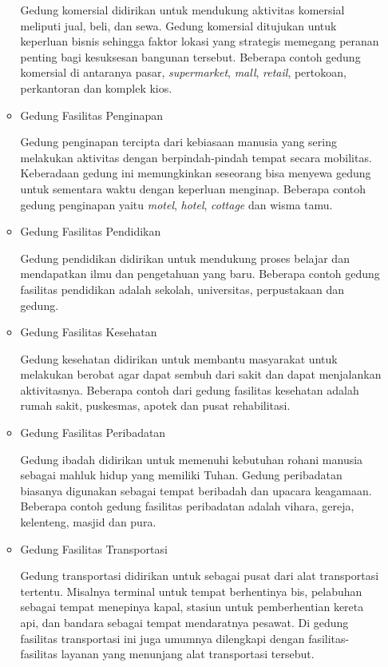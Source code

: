 \begin{itemize}
\begin{itemize}
		Gedung komersial didirikan untuk mendukung aktivitas komersial meliputi jual, beli, dan sewa. Gedung komersial ditujukan untuk keperluan bisnis sehingga faktor lokasi yang strategis memegang peranan penting bagi kesuksesan bangunan tersebut. Beberapa contoh gedung komersial di antaranya pasar, \textit{supermarket}, \textit{mall}, \textit{retail}, pertokoan, perkantoran dan komplek kios.
		
		\item Gedung Fasilitas Penginapan
		
		Gedung penginapan tercipta dari kebiasaan manusia yang sering melakukan aktivitas dengan berpindah-pindah tempat secara mobilitas. Keberadaan gedung ini memungkinkan seseorang bisa menyewa gedung untuk sementara waktu dengan keperluan menginap. Beberapa contoh gedung penginapan yaitu \textit{motel}, \textit{hotel}, \textit{cottage} dan wisma tamu.
	
		\item Gedung Fasilitas Pendidikan
		
		Gedung pendidikan didirikan untuk mendukung proses belajar dan mendapatkan ilmu dan pengetahuan yang baru. Beberapa contoh gedung fasilitas pendidikan adalah sekolah, universitas, perpustakaan dan gedung.
		
		\item Gedung Fasilitas Kesehatan
		
		Gedung kesehatan didirikan untuk membantu masyarakat untuk melakukan berobat agar dapat sembuh dari sakit dan dapat menjalankan aktivitasnya. Beberapa contoh dari gedung fasilitas kesehatan adalah rumah sakit, puskesmas, apotek dan pusat rehabilitasi.
		
		\item Gedung Fasilitas Peribadatan
		
		Gedung ibadah didirikan untuk memenuhi kebutuhan rohani manusia sebagai mahluk hidup yang memiliki Tuhan. Gedung peribadatan biasanya digunakan sebagai tempat beribadah dan upacara keagamaan. Beberapa contoh gedung fasilitas peribadatan adalah vihara, gereja, kelenteng, masjid dan pura.
		
		\item Gedung Fasilitas Transportasi
		
		Gedung transportasi didirikan untuk sebagai pusat dari alat transportasi tertentu. Misalnya terminal untuk tempat berhentinya bis, pelabuhan sebagai tempat menepinya kapal, stasiun untuk pemberhentian kereta api, dan bandara sebagai tempat mendaratnya pesawat. Di gedung fasilitas transportasi ini juga umumnya dilengkapi dengan fasilitas-fasilitas layanan yang menunjang alat transportasi tersebut.
		

\end{itemize}
\end{itemize}
